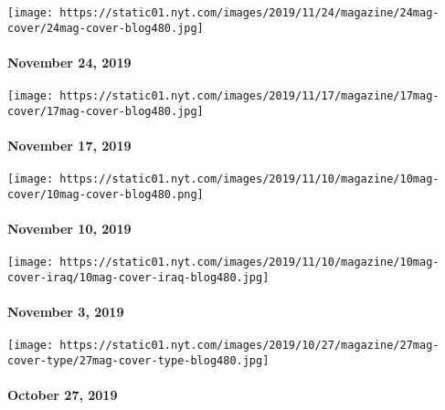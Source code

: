 \texttt{[image: https://static01.nyt.com/images/2019/11/24/magazine/24mag-cover/24mag-cover-blog480.jpg]}

\hypertarget{november-24-2019}{%
\paragraph{November 24, 2019}\label{november-24-2019}}

\href{https://www.nytimes.com/issue/magazine/2019/11/15/the-111719-issue}{}

\texttt{[image: https://static01.nyt.com/images/2019/11/17/magazine/17mag-cover/17mag-cover-blog480.jpg]}

\hypertarget{november-17-2019}{%
\paragraph{November 17, 2019}\label{november-17-2019}}

\href{https://www.nytimes.com/issue/magazine/2019/11/09/the-111019-issue}{}

\texttt{[image: https://static01.nyt.com/images/2019/11/10/magazine/10mag-cover/10mag-cover-blog480.png]}

\hypertarget{november-10-2019}{%
\paragraph{November 10, 2019}\label{november-10-2019}}

\href{https://www.nytimes.com/issue/magazine/2019/11/01/the-11319-issue}{}

\texttt{[image: https://static01.nyt.com/images/2019/11/10/magazine/10mag-cover-iraq/10mag-cover-iraq-blog480.jpg]}

\hypertarget{november-3-2019}{%
\paragraph{November 3, 2019}\label{november-3-2019}}

\href{https://www.nytimes.com/issue/magazine/2019/10/25/the-102719-issue}{}

\texttt{[image: https://static01.nyt.com/images/2019/10/27/magazine/27mag-cover-type/27mag-cover-type-blog480.jpg]}

\hypertarget{october-27-2019}{%
\paragraph{October 27, 2019}\label{october-27-2019}}


